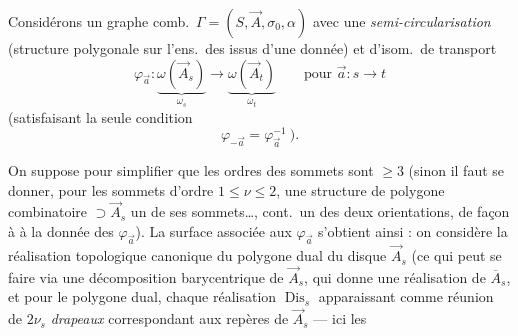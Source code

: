 \documentclass[11pt,a4paper]{article}
\begin{document}
Considérons un graphe comb.\ $\Gamma = (S, \vec{A}, \sigma_0, \alpha)$ avec une \emph{semi-circularisation} (structure polygonale  sur l'ens.\ des  issus d'une  donnée) et  d'isom.\ de transport
\[
\varphi_{\vec{a}} : \underbrace{\omega(\vec{A}_s)}_{\omega_s} \longrightarrow \underbrace{\omega(\vec{A}_t)}_{\omega_t} \qquad \text{pour } \vec{a} : s \to t
\]
(satisfaisant la seule condition
\[
\varphi_{-\vec{a}} = \varphi_{\vec{a}}^{-1}\ ).
\]

On suppose pour simplifier que les ordres des sommets sont $\geq 3$ (sinon il faut se donner, pour les sommets d'ordre $1 \leq \nu \leq 2$, une structure de polygone combinatoire $\supset \vec{A}_s$ \ill{} un de ses sommets\ldots, cont.\ un \ill{} des deux orientations, de façon à  à la donnée des $\varphi_{\vec{a}}$). La surface associée aux $\varphi_{\vec{a}}$ s'obtient ainsi : on considère la réalisation  topologique canonique du polygone dual du disque $\vec{A}_s$ (ce qui peut se faire via une décomposition barycentrique de $\vec{A}_s$, qui donne une réalisation de $\overline{A}_s$, et pour le polygone dual, chaque réalisation \struck{\ill{}} $\operatorname{Dis}_s$ apparaissant comme réunion de $2\nu_s$ \emph{drapeaux} correspondant aux repères de $\vec{A}_s$ --- ici les
\end{document}

